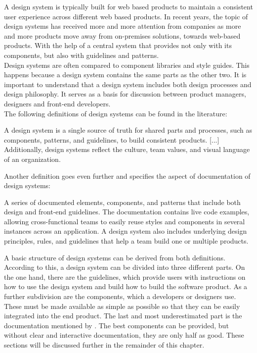 A design system is typically built for web based products to maintain a consistent user experience across different web based products. In recent years, the topic of design systems has received more and more attention from companies as more and more products move away from on-premises solutions, towards web-based products.  With the help of a central system that provides not only with its components, but also with guidelines and patterns.  \citep{macdonald_practical_2019} \\
Design systems are often compared to component libraries and style guides. This happens because a design system contains the same parts as the other two. It is important to understand that a design system includes both design processes and design philosophy.  It serves as a basis for discussion between product managers, designers and front-end developers.   \cite{vesselov_building_2019} \\
The following definitions of design systems can be found in the literature:
\begin{tcolorbox}[title=Definition of design system by \citet*{macdonald_practical_2019}]
A design system is a single source of truth for shared parts and processes, such as components, patterns, and guidelines, to build consistent products. [...] Additionally, design systems reflect the culture, team values, and visual language of an organization.
\end{tcolorbox}
Another definition goes even further and specifies the aspect of documentation of design systems:
\begin{tcolorbox}[title=Definition of design system by \citet*{vesselov_building_2019}]
A series of documented elements, components, and patterns that include both design and front-end guidelines. The documentation contains live code examples, allowing cross-functional teams to easily reuse styles and components in several instances across an application. A design system also includes underlying design principles, rules, and guidelines that help a team build one or multiple products.
\end{tcolorbox}
A basic structure of design systems can be derived from both definitions. According to this, a design system can be divided into three different parts. On the one hand, there are the guidelines, which provide users with instructions on how to use the design system and build how to build the software product. As a further subdivision are the components, which a developers or designers use. These must be made available as simple as possible so that they can be easily integrated into the end product. The last and most underestimated part is the documentation mentioned by \citet*{vesselov_building_2019}. The best components can be provided, but without clear and interactive documentation, they are only half as good.  These sections will be discussed further in the remainder of this chapter. \cite{macdonald_practical_2019}\cite{vesselov_building_2019}

